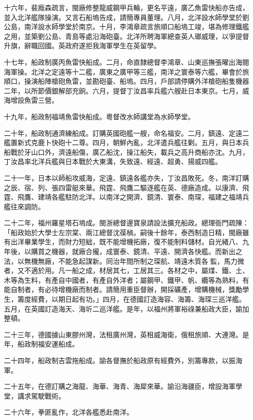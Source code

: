 \begin{pinyinscope}
十六年，裴廕森疏言，閩廠修整龍威鋼甲兵輪，更名平遠，廣乙魚雷快船亦告成，並入北洋艦隊操演。又言石船塢告成，請簡專員董理。八月，北洋設水師學堂於劉公島，南洋設水師學堂於南京。十月，李鴻章疏言旅順口船塢工竣，堪為修理鐵艦之用，並築劉公島、青島等處沿海砲臺。北洋所聘海軍總查英人瑯威理，以爭提督升旗，辭職回國。英政府遂拒我海軍學生在英留學。

十七年，船政制廣丙魚雷快船成。二月，命直隸總督李鴻章、山東巡撫張曜出海閱海軍操。北洋之定遠等十二艦，廣東之廣甲等三艦，南洋之寰泰等六艦，畢會於旅順口，操演船陣槍砲魚雷，並勘砲臺、船塢。四月，戶部請停購外洋槍砲船隻機器二年，以所節價銀解部充餉。六月，提督丁汝昌率兵艦六艘赴日本東京。七月，威海增設魚雷三營。

十九年，船政制福靖魚雷快船成。粵督改水師講堂為水師學堂。

二十年，船政制通濟練船成。訂購英國砲艦一艘，命名福安。二月，鎮遠、定遠二艦置新式克鹿卜快砲十二尊。四月，朝鮮內亂，北洋遣兵艦往剿。五月，與日本兵船戰於牙山口外，濟遠船傷，廣乙船沈，操江船失，載兵之高升商船亦沈。九月，丁汝昌率北洋兵艦與日本戰於大東溝，失致遠、經遠、超勇、揚威四艦。

二十一年，日本以師船攻威海，定遠、鎮遠各艦亦失，丁汝昌敗死。冬，南洋訂購之辰、宿、列、張四雷艇來華。飛霆、飛鷹二驅逐艦在英、德廠造成。以康濟、飛霆、飛鷹、建靖各艦駐防北洋。以南洋之開濟、鏡清、寰泰、南琛，福建之福靖兵艦往來調防。

二十二年，福州羅星塔石塢成。閩浙總督邊寶泉請設法擴充船政。總理衙門疏陳：「船政始於大學士左宗棠、兩江總督沈葆楨。嗣後十餘年，泰西制造日精，閩廠雖有出洋畢業學生，而財力短絀，既不能增機拓廠，復不能制料儲材。自光緒八、九年後，以購買之機器，就廠合攏，成寰泰、鏡清、平遠、開濟各快艦。而新出之法，以無機無廠，不能急起謀新。同治年間所制之琛航、靖遠木質各監，馬力微者，又不適於用。凡一船之成，材居其七，工居其三。各材之中，屬煤、鐵、土、木等為生料，有產自中國者，有產自外洋者；屬鋼甲、鐵甲、帆、纜等為熟料，有能自制者，有必待增機廠而制者。請簡用重臣督辦，開採礦產，增購機械，獎勵學生，籌度經費，以期日起有功。」四月，在德國訂造海容、海籌、海琛三巡洋艦。五月，在英國訂造海天、海圻二巡洋艦。是年，以福州將軍裕祿兼船政大臣，諭加整頓。

二十三年，德國據山東膠州灣，法租廣州灣，英租威海衛，俄租旅順、大連灣。是年，船政制福安運船成。

二十四年，船政制吉雲拖船成。諭各督撫於船政原有經費外，別籌專款，以振海軍。

二十五年，在德訂購之海龍、海華、海青、海犀來華。諭沿海疆臣，增設海軍學堂，講求駕駛戰術。

二十六年，拳匪亂作，北洋各艦悉赴南洋。


\end{pinyinscope}
